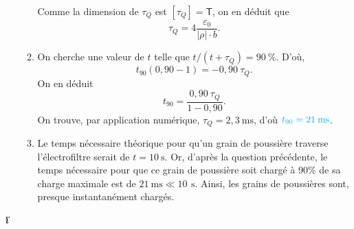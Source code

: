 \documentclass[a4paper, 10pt]{article}
\def\res#1{{\color{cyan}#1}}
\begin{document}
\begin{multicols}{2}
\begin{enumerate}
\begin{enumerate}
						Comme la dimension de $\tau_Q$\/ est $[\tau_Q] = \textsf{T}$, on en déduit que \[
							\boxed{\tau_Q = 4\frac{\varepsilon_0}{|\rho| \cdot b}.}
						\]
					\item On cherche une valeur de $t$\/ telle que $t/(t + \tau_Q) = 90\:\%$.
						D'où, \[
							t_{90}(0{,}90 - 1) = -0{,}90\: \tau_Q
						.\] On en déduit \[
							t_{90} = \frac{0{,}90\: \tau_Q}{1 - 0{,}90}
						.\] On trouve, par application numérique, $\tau_Q = 2{,}3\:\mathrm{ms}$, d'où $\res{t_{90} = 21\:\mathrm{ms}}$.
					\item Le temps nécessaire théorique pour qu'un grain de poussière traverse l'électrofiltre serait de $t = 10\:\mathrm{s}$. Or, d'après la question précédente, le temps nécessaire pour que ce grain de poussière soit chargé à 90\:\% de sa charge maximale est de $21\:\mathrm{ms} \ll 10\,\:\mathrm{s}$. Ainsi, les grains de poussières sont, presque instantanément chargés.
				\end{enumerate}
		\end{enumerate}
	\end{multicols}
	\vfill
	\begin{center}
		{
			\selectfont
			\textit{\textbf{\.{\"i}}}
		}
	\end{center}
	\vfill
	\null
\end{document}
